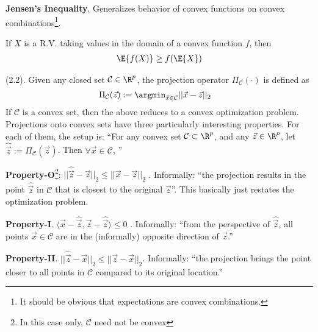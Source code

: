 \documentclass[11pt]{article}
\begin{document}
\textbf{Jensen's Inequality}. Generalizes behavior of convex functions on convex combinations\footnote{It should be obvious that expectations are convex combinations.}.
\begin{definition}[-1em]
	If $X$ is a R.V. taking values in the domain of a convex function $f$, then
	\begin{align}
	\E{f(X)} \ge f(\E{X})
	\end{align}
\end{definition}


\myspace{}
\p {} (2.2). Given any closed set $\mathcal C \in \R^p$, the projection operator $\Pi_{\mathcal C}(\cdot)$ is defined as
\begin{align}
\Pi_{\mathcal C}(\vec z)
&:= \argmin_{\vec x \in \mathcal C} || \vec x - \vec z ||_2
\end{align}
If $\mathcal C$ is a convex set, then the above reduces to a convex optimization problem. Projections onto convex sets have three particularly interesting properties. For each of them, the setup is: ``For any convex set $\mathcal C \subset \R^p$, and any $\vec z \in \R^p$, let $\hat{\vec z} := \Pi_{\mathcal C}(\vec z)$. Then $\forall \vec x \in \mathcal C$, \textellipsis''
\begin{compactitem}
	\item \textbf{Property-O}\footnote{In this case only, $\mathcal C$ need not be convex}: 
	$
	||\hat{\vec z} - \vec z||_2 \le ||\vec x - \vec z||_2
	$
	. Informally: ``the projection results in the point $\hat{\vec z}$ in $\mathcal C$ that is closest to the original $\vec z$''. This basically just restates the optimization problem. 
	
	\item \textbf{Property-I}. 
	$
	\langle \vec x - \hat{\vec z}, \vec z - \hat{\vec z} \rangle \le 0
	$
	. Informally: ``from the perspective of $\hat{\vec z}$, all points $\vec x \in \mathcal C$ are in the (informally) opposite direction of $\vec z$.''
	
	\item \textbf{Property-II}. $|| \hat{\vec z} - \vec x||_2 \le ||\vec z - \vec x||_2$. Informally: ``the projection brings the point closer to all points in $\mathcal C$ compared to its original location.''
\end{compactitem}
\end{document}
